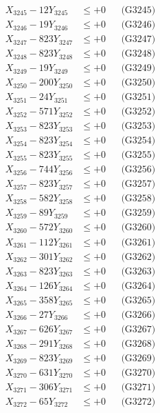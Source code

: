 \documentclass[a4paper,10pt]{article}
\begin{document}
{\begin{align}
X_{3245} - 12Y_{3245} &\leq +0 && \text{(G3245)} \\
X_{3246} - 19Y_{3246} &\leq +0 && \text{(G3246)} \\
X_{3247} - 823Y_{3247} &\leq +0 && \text{(G3247)} \\
X_{3248} - 823Y_{3248} &\leq +0 && \text{(G3248)} \\
X_{3249} - 19Y_{3249} &\leq +0 && \text{(G3249)} \\
X_{3250} - 200Y_{3250} &\leq +0 && \text{(G3250)} \\
\allowbreak
X_{3251} - 24Y_{3251} &\leq +0 && \text{(G3251)} \\
X_{3252} - 571Y_{3252} &\leq +0 && \text{(G3252)} \\
X_{3253} - 823Y_{3253} &\leq +0 && \text{(G3253)} \\
X_{3254} - 823Y_{3254} &\leq +0 && \text{(G3254)} \\
X_{3255} - 823Y_{3255} &\leq +0 && \text{(G3255)} \\
X_{3256} - 744Y_{3256} &\leq +0 && \text{(G3256)} \\
X_{3257} - 823Y_{3257} &\leq +0 && \text{(G3257)} \\
X_{3258} - 582Y_{3258} &\leq +0 && \text{(G3258)} \\
X_{3259} - 89Y_{3259} &\leq +0 && \text{(G3259)} \\
X_{3260} - 572Y_{3260} &\leq +0 && \text{(G3260)} \\
\allowbreak
X_{3261} - 112Y_{3261} &\leq +0 && \text{(G3261)} \\
X_{3262} - 301Y_{3262} &\leq +0 && \text{(G3262)} \\
X_{3263} - 823Y_{3263} &\leq +0 && \text{(G3263)} \\
X_{3264} - 126Y_{3264} &\leq +0 && \text{(G3264)} \\
X_{3265} - 358Y_{3265} &\leq +0 && \text{(G3265)} \\
X_{3266} - 27Y_{3266} &\leq +0 && \text{(G3266)} \\
X_{3267} - 626Y_{3267} &\leq +0 && \text{(G3267)} \\
X_{3268} - 291Y_{3268} &\leq +0 && \text{(G3268)} \\
X_{3269} - 823Y_{3269} &\leq +0 && \text{(G3269)} \\
X_{3270} - 631Y_{3270} &\leq +0 && \text{(G3270)} \\
\allowbreak
X_{3271} - 306Y_{3271} &\leq +0 && \text{(G3271)} \\
X_{3272} - 65Y_{3272} &\leq +0 && \text{(G3272)} \\

\end{align}}
\end{document}

